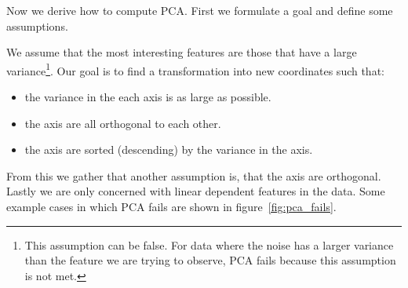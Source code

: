 Now we derive how to compute PCA. First we formulate a goal and define some assumptions.

We assume that the most interesting features are those that have a large variance\footnote{This assumption can be false. For data where the noise has a larger variance than the feature we are trying to observe, PCA fails because this assumption is not met.}. Our goal is to find a transformation into new coordinates such that:
\begin{itemize}
	\item the variance in the each axis is as large as possible.
	\item the axis are all orthogonal to each other.
	\item the axis are sorted (descending) by the variance in the axis.
\end{itemize}

From this we gather that another assumption is, that the axis are orthogonal. Lastly we are only concerned with linear dependent features in the data. Some example cases in which PCA fails are shown in figure~\ref{fig:pca_fails}.

